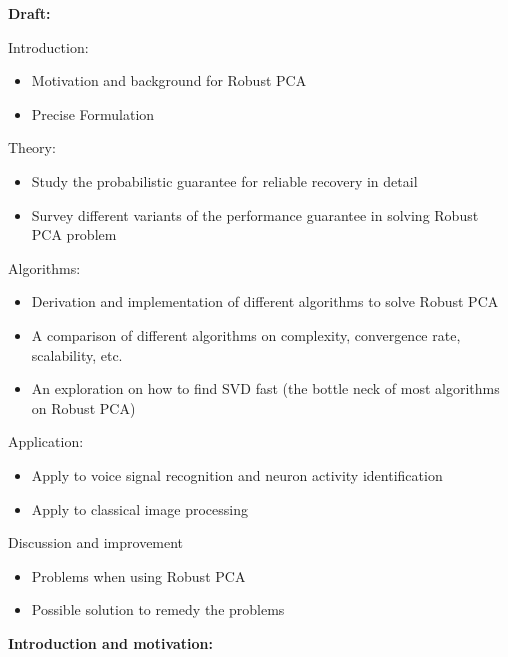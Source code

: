 \documentclass{../../common/projectreport}
\begin{document}
\textbf{Draft:}


Introduction:
\begin{itemize}
\item Motivation and background for Robust PCA 
\item Precise Formulation
\end{itemize}
Theory:
\begin{itemize}
\item Study the probabilistic guarantee for reliable recovery in detail
\item Survey different variants of the performance guarantee in solving Robust PCA problem
\end{itemize}
Algorithms:
\begin{itemize}
\item Derivation and implementation of different algorithms to solve Robust PCA
\item A comparison of different algorithms on complexity, convergence rate, scalability, etc.
\item An exploration on how to find SVD fast (the bottle neck of most algorithms on Robust PCA) 
\end{itemize}
Application:
\begin{itemize}
\item Apply to voice signal recognition and neuron activity identification
\item Apply to classical image processing
\end{itemize}
Discussion and improvement
\begin{itemize}
\item Problems when using Robust PCA
\item Possible solution to remedy the problems
\end{itemize}

\vspace{5ex}

\textbf{Introduction and motivation:}
\end{document}
